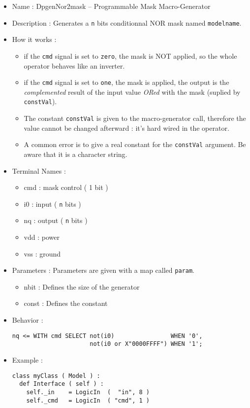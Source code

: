 \begin{itemize}
    \item Name : DpgenNor2mask -- Programmable Mask Macro-Generator
    \item Description : Generates a \verb-n- bits conditionnal NOR mask named \verb-modelname-.
    \item How it works :
    \begin{itemize}
        \item if the \verb-cmd- signal is set to \verb-zero-, the mask is NOT applied, so the whole operator behaves like an inverter.
        \item if the \verb-cmd- signal is set to \verb-one-, the mask is applied, the output is the \emph{complemented} result of the input value \emph{ORed} with the mask (suplied by \verb-constVal-).
        \item The constant \verb-constVal- is given to the macro-generator call, therefore the value cannot be changed afterward : it's hard wired in the operator.
        \item A common error is to give a real constant for the \verb-constVal- argument. Be aware that it is a character string.
    \end{itemize}
    \item Terminal Names :
    \begin{itemize}
        \item cmd : mask control ( 1 bit )
        \item i0 : input ( \verb-n- bits )
        \item nq : output ( \verb-n- bits )
        \item vdd : power
        \item vss : ground
    \end{itemize}
    \item Parameters : Parameters are given with a map called \verb-param-.
    \begin{itemize}
        \item nbit : Defines the size of the generator
        \item const : Defines the constant
    \end{itemize}
    \item Behavior :
\begin{verbatim}
nq <= WITH cmd SELECT not(i0)                WHEN '0',
                      not(i0 or X"0000FFFF") WHEN '1';
\end{verbatim}
    \item Example :
\begin{verbatim}
class myClass ( Model ) :
  def Interface ( self ) :
    self._in    = LogicIn  (  "in", 8 )
    self._cmd   = LogicIn  ( "cmd", 1 )
    

\end{verbatim}
\end{itemize}
